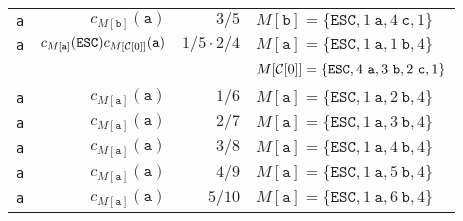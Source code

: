 \documentclass{article}
\begin{document}
\begin{tabular}{crrl}
    {\tt a} & $c_{M[\mathtt{b}]}(\mathtt a)$ & $3/5$ & $M[\mathtt{b}]=\{\mathtt{ESC},1~\mathtt{a},4~\mathtt{c},1\}$\\
    {\tt a} & $c_{M[\mathtt{a}]}(\mathtt{ESC})c_{M[{\cal C}[0]]}(\mathtt a)$ & $1/5\cdot 2/4$ & $M[\mathtt{a}]=\{\mathtt{ESC},1~\mathtt{a},1~\mathtt{b},4\}$\\
    ~       & & & $M[{\cal C}[0]]=\{\mathtt{ESC},4~\mathtt{a},3~\mathtt{b},2~\mathtt{c},1\}$\\
    {\tt a} & $c_{M[\mathtt{a}]}(\mathtt a)$ & $1/6$ & $M[\mathtt{a}]=\{\mathtt{ESC},1~\mathtt{a},2~\mathtt{b},4\}$\\
    {\tt a} & $c_{M[\mathtt{a}]}(\mathtt a)$ & $2/7$ & $M[\mathtt{a}]=\{\mathtt{ESC},1~\mathtt{a},3~\mathtt{b},4\}$\\
    {\tt a} & $c_{M[\mathtt{a}]}(\mathtt a)$ & $3/8$ & $M[\mathtt{a}]=\{\mathtt{ESC},1~\mathtt{a},4~\mathtt{b},4\}$\\
    {\tt a} & $c_{M[\mathtt{a}]}(\mathtt a)$ & $4/9$ & $M[\mathtt{a}]=\{\mathtt{ESC},1~\mathtt{a},5~\mathtt{b},4\}$\\
    {\tt a} & $c_{M[\mathtt{a}]}(\mathtt a)$ & $5/10$ & $M[\mathtt{a}]=\{\mathtt{ESC},1~\mathtt{a},6~\mathtt{b},4\}$
  \end{tabular}
\end{document}
